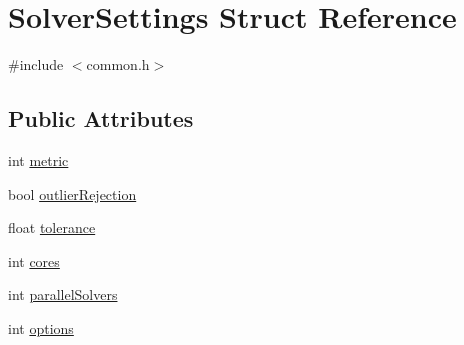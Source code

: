 \hypertarget{structSolverSettings}{\section{\-Solver\-Settings \-Struct \-Reference}
\label{structSolverSettings}
}


{\ttfamily \#include $<$common.\-h$>$}

\subsection*{\-Public \-Attributes}
\begin{DoxyCompactItemize}
\item 
int \hyperlink{structSolverSettings_acf7de9862fb4276d91a1319f220b564a}{metric}
\item 
bool \hyperlink{structSolverSettings_a82eb7bb6b04a2ce6588f8dec8ba09ae5}{outlier\-Rejection}
\item 
float \hyperlink{structSolverSettings_af42a46e051dd69c1bf2f2aa208a8be8f}{tolerance}
\item 
int \hyperlink{structSolverSettings_a6c340bb77bf658db01c727c5e847ddf9}{cores}
\item 
int \hyperlink{structSolverSettings_abd3876067bab2a3808e4c43586a97ff0}{parallel\-Solvers}
\item 
int \hyperlink{structSolverSettings_a83783c865ae94804cf034840547f6d56}{options}
\end{DoxyCompactItemize}


